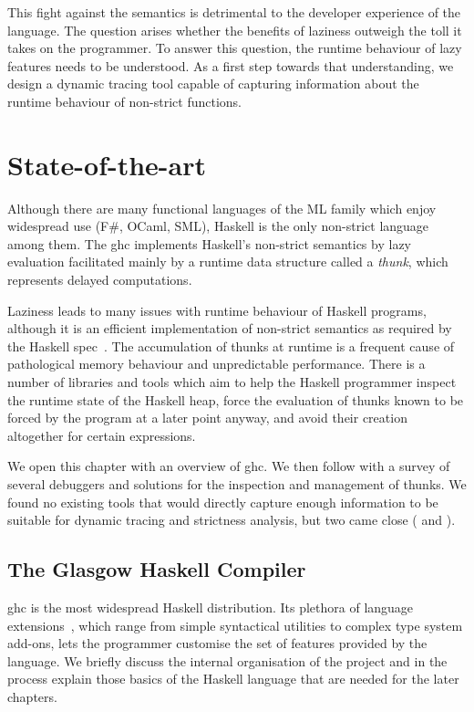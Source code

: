 \documentclass[thesis=B,english]{FITthesis}[2019/12/23]
\begin{document}
This fight against the semantics is detrimental to the developer experience of
the language. The question arises whether the benefits of laziness outweigh the
toll it takes on the programmer. To answer this question, the runtime behaviour
of lazy features needs to be understood. As a first step towards that
understanding, we design a dynamic tracing tool capable of capturing
information about the runtime behaviour of non-strict functions.


\chapter{State-of-the-art} \label{sec:state-of-the-art}
Although there are many functional languages of the ML family which enjoy
widespread use (F\#, OCaml, SML), Haskell is the only non-strict language among
them. The \acrfull{ghc} implements Haskell's non-strict semantics by lazy
evaluation facilitated mainly by a runtime data structure called a
\textit{thunk}, which represents delayed computations.

Laziness leads to many issues with runtime behaviour of Haskell programs,
although it is an efficient implementation of non-strict semantics as required
by the Haskell spec~\cite{haskell2010}. The accumulation of thunks at runtime is
a frequent cause of pathological memory behaviour and unpredictable
performance. There is a number of libraries and tools which aim to help the
Haskell programmer inspect the runtime state of the Haskell heap, force the
evaluation of thunks known to be forced by the program at a later point anyway,
and avoid their creation altogether for certain expressions.

We open this chapter with an overview of \acrshort{ghc}. We then follow with a
survey of several debuggers and solutions for the inspection and management of
thunks. We found no existing tools that would directly capture enough
information to be suitable for dynamic tracing and strictness analysis, but two
came close ( and ).


\section{The Glasgow Haskell Compiler} \label{sec:ghc}
\acrshort{ghc} is the most widespread Haskell distribution. Its plethora of
language extensions~\cite{ghc-language-extensions}, which range from simple
syntactical utilities to complex type system add-ons, lets the programmer
customise the set of features provided by the language. We briefly discuss the
internal organisation of the project and in the process explain those basics of
the Haskell language that are needed for the later chapters.
\end{document}
